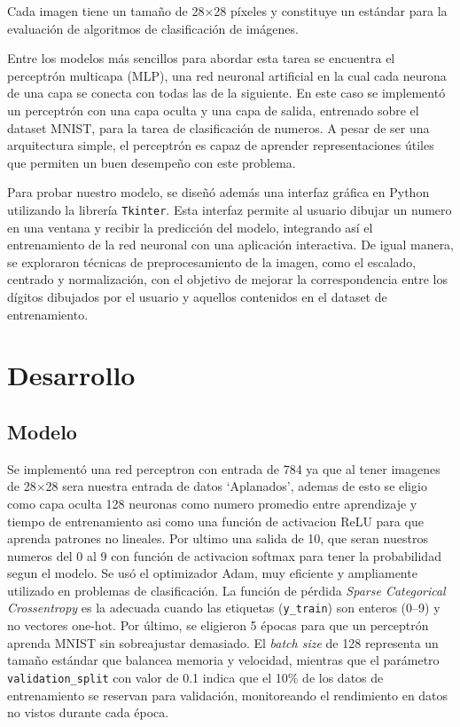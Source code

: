 \documentclass{iopjournal}
\begin{document}
Cada imagen tiene un tamaño de 28$\times$28 píxeles y constituye un estándar para la evaluación de algoritmos de clasificación de imágenes.

Entre los modelos más sencillos para abordar esta tarea se encuentra el perceptrón multicapa (MLP), una red neuronal artificial en la cual 
cada neurona de una capa se conecta con todas las de la siguiente. En este caso se implementó un perceptrón con una capa oculta y una capa 
de salida, entrenado sobre el dataset MNIST, para la tarea de clasificación de numeros. A pesar de ser una arquitectura simple, el 
perceptrón es capaz de aprender representaciones útiles que permiten un buen desempeño con este problema.

Para probar nuestro modelo, se diseñó además una interfaz gráfica en Python utilizando la librería \texttt{Tkinter}. 
Esta interfaz permite al usuario dibujar un numero en una ventana y recibir la predicción del modelo, integrando así el entrenamiento 
de la red neuronal con una aplicación interactiva. De igual manera, se exploraron técnicas de preprocesamiento de la imagen, como el escalado, 
centrado y normalización, con el objetivo de mejorar la correspondencia entre los dígitos dibujados por el usuario y aquellos 
contenidos en el dataset de entrenamiento.


\section{Desarrollo}
\subsection{Modelo}
Se implementó una red perceptron con entrada de 784 ya que al tener imagenes de 28$\times$28 sera nuestra entrada de datos `Aplanados', ademas
de esto se eligio como capa oculta 128 neuronas como numero promedio entre aprendizaje y tiempo de entrenamiento asi como una función de
activacion ReLU para que aprenda patrones no lineales. Por ultimo una salida de 10, que seran nuestros numeros del 0 al 9 con función de activacion
softmax para tener la probabilidad segun el modelo.
Se usó el optimizador Adam, muy eficiente y ampliamente utilizado en problemas de clasificación.
La función de pérdida \textit{Sparse Categorical Crossentropy} es la adecuada cuando las etiquetas (\texttt{y\_train}) son enteros (0--9) y no vectores one-hot. 
Por último, se eligieron 5 épocas para que un perceptrón aprenda MNIST sin sobreajustar demasiado. 
El \textit{batch size} de 128 representa un tamaño estándar que balancea memoria y velocidad, 
mientras que el parámetro \texttt{validation\_split} con valor de 0.1 indica que el 10\% de los datos de entrenamiento se reservan para validación, 
monitoreando el rendimiento en datos no vistos durante cada época.
\end{document}
